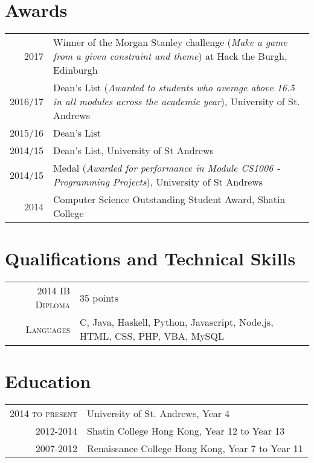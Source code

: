 \documentclass{article}
\begin{document}
\section*{Awards}
\begin{tabular}{r|p{17cm}}
\textsc{2017} & Winner of the Morgan Stanley challenge (\textit{Make a game from a given constraint and theme}) at Hack the Burgh, Edinburgh\\

\textsc{2016/17} & Dean's List (\textit{Awarded to students who average above 16.5 in all modules across the academic year}), University of St. Andrews \\

\textsc{2015/16} & Dean's List  \\

\textsc{2014/15} & Dean’s List, University of St Andrews\\

\textsc{2014/15} & Medal (\textit{Awarded for performance in Module CS1006 - Programming Projects}), University of St Andrews\\

\textsc{2014} & Computer Science Outstanding Student Award, Shatin College \\
\end{tabular}

\section*{Qualifications and Technical Skills}
\begin{tabular}{r|p{15cm}}
\textsc{2014 IB Diploma} &  35 points\\
\textsc{Languages} & C, Java, Haskell, Python, Javascript, Node.js, HTML, CSS, PHP, VBA, MySQL\\
\end{tabular}

\section*{Education}
\begin{tabular}{r|p{15cm}}
\textsc{2014 to present} & University of St. Andrews, Year 4\\

\textsc{2012-2014} & Shatin College Hong Kong, Year 12 to Year 13\\

\textsc{2007-2012} & Renaissance College Hong Kong, Year 7 to Year 11\\

\end{tabular}
\end{document}
